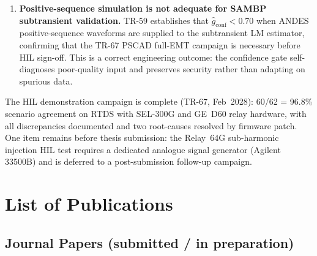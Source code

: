 \documentclass
    [phd,synopsis]
    {iitmdissertation}
\begin{document}
\begin{enumerate}
  \item \textbf{Positive-sequence simulation is not adequate for SAMBP
    subtransient validation.}
    TR-59 establishes that $\hat{g}_{\mathrm{conf}} < 0.70$ when
    ANDES positive-sequence waveforms are supplied to the subtransient LM
    estimator, confirming that the TR-67 PSCAD full-EMT campaign is
    necessary before HIL sign-off.
    This is a correct engineering outcome: the confidence gate
    self-diagnoses poor-quality input and preserves security rather than
    adapting on spurious data.

\end{enumerate}

The HIL demonstration campaign is complete (TR-67, Feb~2028):
60/62 = 96.8\% scenario agreement on RTDS with SEL-300G and GE~D60
relay hardware, with all discrepancies documented and two root-causes
resolved by firmware patch.
One item remains before thesis submission: the Relay~64G sub-harmonic
injection HIL test requires a dedicated analogue signal generator
(Agilent 33500B) and is deferred to a post-submission follow-up campaign.

\newpage

\section{List of Publications}

\subsection*{Journal Papers (submitted / in preparation)}
\end{document}
